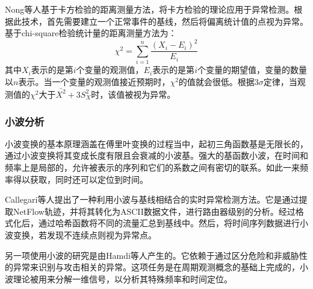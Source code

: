 
Nong等人\cite{Nong2010An}基于卡方检验的距离测量方法，将卡方检验的理论应用于异常检测。根据此技术，首先需要建立一个正常事件的基线，然后将偏离统计值的点视为异常。基于chi-square检验统计量的距离测量方法为：
\begin{equation}
    \chi^2 = \sum_{i=1}^n \frac{(X_i - E_i)^2}{E_i}
\end{equation}
其中$X_i$表示的是第$i$个变量的观测值，$E_i$表示的是第$i$个变量的期望值，变量的数量以$n$表示。当一个变量的观测值接近预期时，$\chi^2$的值就会很低。根据$3\sigma$定律，当观测值的$\chi^2$大于$\bar{X^2}+3S_X^2$时，该值被视为异常。

\subsubsection{小波分析} 
小波变换的基本原理涵盖在傅里叶变换的过程当中，起初三角函数基是无限长的，通过小波变换将其变成长度有限且会衰减的小波基。强大的基函数小波，在时间和频率上是局部的，允许被表示的序列和它们的系数之间有密切的联系。如此一来频率得以获取，同时还可以定位到时间。


Callegari等人\cite{callegari2011combining}提出了一种利用小波与基线相结合的实时异常检测方法。它是通过提取NetFlow轨迹，并将其转化为ASCII数据文件，进行路由器级别的分析。经过格式化后，通过哈希函数将不同的流量汇总到基线中。然后，将时间序列数据进行小波变换，若发现不连续点则视为异常点。

另一项使用小波的研究是由Hamdi等人\cite{hamdi2007detecting}产生的。它依赖于通过区分危险和非威胁性的异常来识别与攻击相关的异常。这项任务是在周期观测概念的基础上完成的，小波理论被用来分解一维信号，以分析其特殊频率和时间定位。

